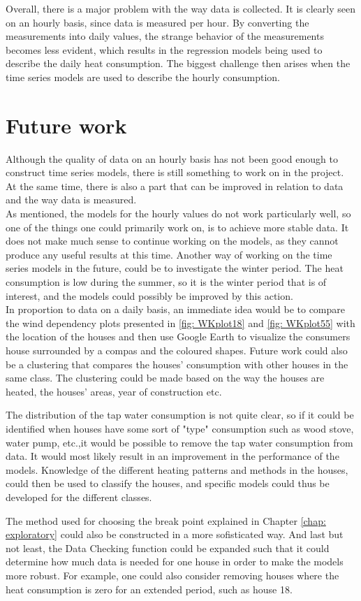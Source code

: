 \noindent Overall, there is a major problem with the way data is collected. It is clearly seen on an hourly basis, since data is measured per hour. By converting the measurements into daily values, the strange behavior of the measurements becomes less evident, which results in the regression models being used to describe the daily heat consumption. The biggest challenge then arises when the time series models are used to describe the hourly consumption.


\section{Future work}
Although the quality of data on an hourly basis has not been good enough to construct time series models, there is still something to work on in the project. At the same time, there is also a part that can be improved in relation to data and the way data is measured. \\

\noindent As mentioned, the models for the hourly values do not ​​work particularly well, so one of the things one could primarily work on, is to achieve more stable data. It does not make much sense to continue working on the models, as they cannot produce any useful results at this time. Another way of working on the time series models in the future, could be to investigate the winter period. The heat consumption is low during the summer, so it is the winter period that is of interest, and the models could possibly be improved by this action. \\

\noindent In proportion to data on a daily basis, an immediate idea would be to compare the wind dependency plots presented in \cref{fig: WKplot18} and \cref{fig: WKplot55} with the location of the houses and then use Google Earth to visualize the consumers house surrounded by a compas and the coloured shapes. Future work could also be a clustering that compares the houses' consumption with other houses in the same class. The clustering could be made based on the way the houses are heated, the houses' areas, year of construction etc.

\noindent The distribution of the tap water consumption is not quite clear, so if it could be identified when houses have some sort of "type" consumption such as wood stove, water pump, etc.,it would be possible to remove the tap water consumption from data. It would most likely result in an improvement in the performance of the models. Knowledge of the different heating patterns and methods in the houses, could then be used to classify the houses, and specific models could thus be developed for the different classes.

\noindent The method used for choosing the break point explained in Chapter \ref{chap: exploratory} could also be constructed in a more sofisticated way. And last but not least, the Data Checking function could be expanded such that it could determine how much data is needed for one house in order to make the models more robust. For example, one could also consider removing houses where the heat consumption is zero for an extended period, such as house 18.

